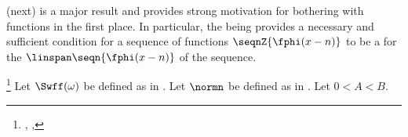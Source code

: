  (next) is a major result and provides strong motivation for 
bothering with  functions in the first place.
In particular, the  being  provides a necessary and sufficient condition 
for a sequence of functions $\seqnZ{\fphi(x-n)}$ to be a  
for the  $\linspan\seqn{\fphi(x-n)}$ of the sequence.
\begin{theorem}
\footnote{
  ,
  ,
  }
\label{thm:rbasis_S}
Let $\Swff(\omega)$ be defined as in .
Let $\normn$ be defined as in .
Let $0<A<B$. 
\end{theorem}
